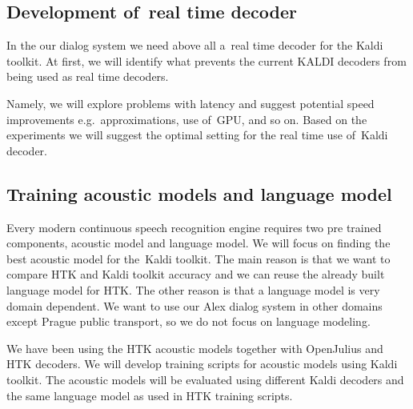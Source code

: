 


\subsection{Development of~real time decoder}
\label{sub:kaldi_rt_decoder}
In the our dialog system we need above all a~real time decoder for the Kaldi toolkit. At first, we will identify what prevents the current KALDI decoders from being used as real time decoders. 

Namely, we will explore problems with latency and suggest potential speed improvements e.g.\ approximations, use of~GPU, and so on. Based on the experiments we will suggest the optimal setting for the real time use of~Kaldi decoder.


\subsection{Training acoustic models and language model} 
\label{sub:training_kaldi_acoustic_models}
Every modern continuous speech recognition engine requires two pre trained components, acoustic model and language model.
We will focus on finding the best acoustic model for the~Kaldi toolkit. The main reason is that we want to compare HTK and Kaldi toolkit accuracy and we can reuse the already built language model for HTK.
The other reason is that a language model is very domain dependent. We want to use our Alex dialog system in other domains except Prague public transport, so we do not focus on language modeling. 

We have been using the HTK acoustic models together with OpenJulius and HTK decoders. We will develop training scripts for acoustic models using Kaldi toolkit. The acoustic models will be evaluated using different Kaldi decoders and the same language model as used in HTK training scripts. 

